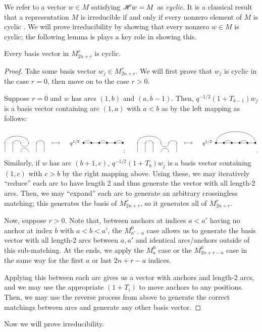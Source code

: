 \documentclass{amsart}
\begin{document}
We refer to a vector $w \in M$ satisfying $\mathscr{H} w = M$ as \emph{cyclic}.
It is a classical result that a representation $M$ is irreducible if and only if every nonzero element of $M$ is cyclic \cite{Etingof}.
We will prove irreducibility by showing that every nonzero $w \in M$ is cyclic;
the following lemma is plays a key role in showing this.

\begin{lemma}
  \label{Cyclic}
  Every basis vector in $M_{2n + r}^r$ is cyclic.
\end{lemma}
\begin{proof}
  Take some basis vector $w_j \in M_{2n + r}^r$.
  We will first prove that $w_j$ is cyclic in the case $r = 0$, then move on to the case $r > 0$.

  Suppose $r = 0$ and $w$ has arcs $(1,b)$ and $(a,b-1)$.
  Then, $q^{-1/2}(1 + T_{b-1})w_j$ is a basis vector containing arc $(1,a)$ with $a < b$ as by the left mapping as follows:
  \[
    \Action{6}{1/4, 2/3, 5/6}{3}{1/2, 3/4, 5/6}{q^{1/2}}; \hspace{20pt} 
    \Action{6}{1/4, 2/3, 5/6}{4}{1/6, 2/3, 4/5}{q^{1/2}}. 
  \]
  Similarly, if $w$ has arc $(b+1,c)$, $q^{-1/2}(1 + T_b)w_j$ is a basis vector containing $(1,c)$ with $c > b$ by the right mapping above.
  Using these, we may iteratively ``reduce'' each arc to have length 2 and thus generate the vector with all length-2 arcs.
  Then, we may ``expand'' each arc to generate an arbitrary crossingless matching;
  this generates the basis of $M_{2n + r}^r$, so it generates all of $M_{2n + r}^r$.

  Now, suppose $r > 0$.
  Note that, between anchors at indices $a<a'$ having no anchor at index $b$ with $a < b < a'$, the $M_{a'-a}^0$ case allows us to generate the basis vector with all length-2 arcs between $a,a'$ and identical arcs/anchors outside of this sub-matching.
  At the ends, we apply the $M_a^0$ case or the $M_{2n + r - a}^{0}$ case in the same way for the first $a$ or last $2n + r - a$ indices.

  Applying this between each arc gives us a vector with anchors and length-2 arcs, and we may use the appropriate $(1+T_i)$ to move anchors to any positions.
  Then, we may use the reverse process from above to generate the correct matchings between arcs and generate any other basis vector.
\end{proof}

Now we will prove irreducibility.
\end{document}
